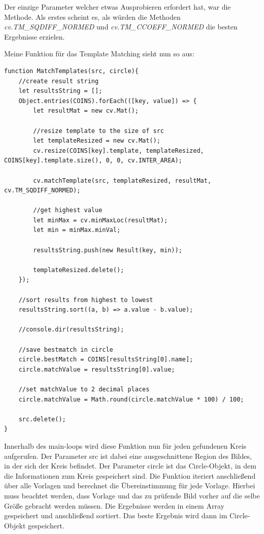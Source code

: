 Der einzige Parameter welcher etwas Ausprobieren erfordert hat, war die Methode. Als erstes scheint es, als würden die Methoden \textit{cv.TM\_SQDIFF\_NORMED} und \textit{cv.TM\_CCOEFF\_NORMED} die besten Ergebnisse erzielen. 

Meine Funktion für das Template Matching sieht nun so aus:
\begin{lstlisting}[style=JavaScript]
function MatchTemplates(src, circle){
    //create result string
    let resultsString = [];
    Object.entries(COINS).forEach(([key, value]) => {
        let resultMat = new cv.Mat();

        //resize template to the size of src
        let templateResized = new cv.Mat();
        cv.resize(COINS[key].template, templateResized, COINS[key].template.size(), 0, 0, cv.INTER_AREA);

        cv.matchTemplate(src, templateResized, resultMat, cv.TM_SQDIFF_NORMED);

        //get highest value
        let minMax = cv.minMaxLoc(resultMat);
        let min = minMax.minVal;

        resultsString.push(new Result(key, min));

        templateResized.delete();
    });

    //sort results from highest to lowest
    resultsString.sort((a, b) => a.value - b.value);

    //console.dir(resultsString);

    //save bestmatch in circle
    circle.bestMatch = COINS[resultsString[0].name];
    circle.matchValue = resultsString[0].value;

    //set matchValue to 2 decimal places
    circle.matchValue = Math.round(circle.matchValue * 100) / 100;

    src.delete();
}
\end{lstlisting}

Innerhalb des main-loops wird diese Funktion nun für jeden gefundenen Kreis aufgerufen. Der Parameter \glqq src\grqq{} ist dabei eine ausgeschnittene Region des Bildes, in der sich der Kreis befindet. Der Parameter \glqq circle\grqq{} ist das Circle-Objekt, in dem die Informationen zum Kreis gespeichert sind. Die Funktion iteriert anschließend über alle Vorlagen und berechnet die Übereinstimmung für jede Vorlage. Hierbei muss beachtet werden, dass Vorlage und das zu prüfende Bild vorher auf die selbe Größe gebracht werden müssen. Die Ergebnisse werden in einem Array gespeichert und anschließend sortiert. Das beste Ergebnis wird dann im Circle-Objekt gespeichert.

